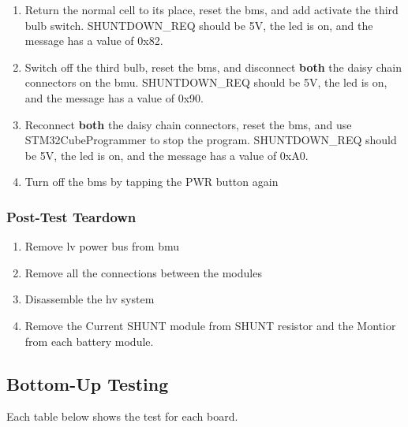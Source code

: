 \begin{enumerate}
	\item Return the normal cell to its place, reset the \gls{bms}, and add activate the third bulb switch. SHUNTDOWN\_REQ should be 5V, the \gls{led} is on, and the message has a value of 0x82.
	\item Switch off the third bulb, reset the \gls{bms}, and disconnect \textbf{both} the daisy chain connectors on the \gls{bmu}. SHUNTDOWN\_REQ should be 5V, the \gls{led} is on, and the message has a value of 0x90.
	\item Reconnect \textbf{both} the daisy chain connectors, reset the \gls{bms}, and use STM32CubeProgrammer to stop the program. SHUNTDOWN\_REQ should be 5V, the \gls{led} is on, and the message has a value of 0xA0.
	\item Turn off the \gls{bms} by tapping the PWR button again
\end{enumerate}

\subsubsection{Post-Test Teardown}

\begin{enumerate}
	\item Remove \gls{lv} power bus from \gls{bmu}
	\item Remove all the connections between the modules
	\item Disassemble the \gls{hv} system
	\item Remove the Current SHUNT module from SHUNT resistor and the Montior from each battery module.
\end{enumerate}

\subsection{Bottom-Up Testing}

Each table below shows the test for each board.

